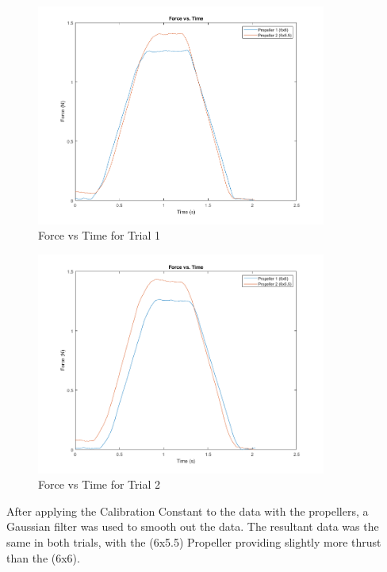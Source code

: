 \documentclass{article}
\begin{document}
\begin{figure}[H]
  \centering
  \includegraphics[width = 0.85\textwidth]{finalprojectimages/Trial1_ForcevTime.png}
  \caption{Force vs Time for Trial 1}
  \label{fig:forcevtime}
\end{figure}
\begin{figure}[H]
  \centering
  \includegraphics[width = 0.85\textwidth]{finalprojectimages/Trial2_ForcevTime.png}
  \caption{Force vs Time for Trial 2}
  \label{fig:forcevtime2}
\end{figure}

After applying the Calibration Constant to the data with the propellers, a Gaussian filter was used to smooth out the data.  The resultant data was the same in both trials, with the (6x5.5) Propeller providing slightly more thrust than the (6x6).
\end{document}
